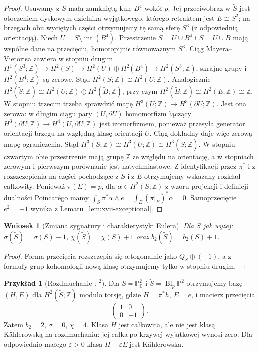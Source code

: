 \documentclass[11pt,a4paper,oneside]{report}
\newcommand{\C}{\mathbb{C}}
\newcommand{\Z}{\mathbb{Z}}
\theoremstyle{plain}
\newtheorem{wniosek}[twierdzenie]{Wniosek}
\theoremstyle{definition}
\newtheorem{przyklad}[twierdzenie]{Przykład}
\theoremstyle{remark}
\begin{document}
\begin{proof}
Usuwamy z $S$ małą zamkniętą kulę $B^4$ wokół $p$.
Jej przeciwobraz w $\widetilde S$ jest otoczeniem dyskowym
dzielnika wyjątkowego, którego retraktem jest $E\cong S^2$;
na brzegach obu wyciętych części otrzymujemy tę samą
sferę $S^3$ (z odpowiednią orientacją).
Niech $U=S\setminus\operatorname{int}(B^4)$.
Przestrzenie $S=U\cup B^4$ i
$\widetilde S=U\cup\widetilde B$
mają wspólne dane na przecięciu, homotopijnie równoważnym
$S^3$. Ciąg Mayera--Vietorisa zawiera w stopniu drugim
$H^1(S^3;\Z)\to H^2(S)\to H^2(U)\oplus H^2(B^4)
\to H^2(S^3;\Z)$; skrajne grupy i $H^2(B^4;\Z)$
są zerowe. Stąd $H^2(S;\Z)\cong H^2(U;\Z)$.
Analogicznie $H^2(\widetilde S;\Z)\cong
H^2(U;\Z)\oplus H^2(\widetilde B;\Z)$, przy czym
$H^2(\widetilde B;\Z)\cong H^2(E;\Z)\cong\Z$.
W stopniu trzecim trzeba sprawdzić mapę
$H^3(U;\Z)\to H^3(\partial U;\Z)$.
Jest ona zerowa: w długim ciągu pary $(U,\partial U)$
homomorfizm łączący
$H^3(\partial U;\Z)\to H^4(U,\partial U;\Z)$
jest izomorfizmem, ponieważ przesyła generator
orientacji brzegu na względną klasę orientacji $U$.
Ciąg dokładny daje więc zerową mapę ograniczenia.
Stąd $H^3(S;\Z)\cong H^3(U;\Z)\cong H^3(\widetilde S;\Z)$.
W stopniu czwartym obie przestrzenie mają grupę $\Z$
ze względu na orientację, a w stopniach zerowym i pierwszym
porównanie jest natychmiastowe.
Z identyfikacji przez $\pi^*$ i z rozszczepienia
na części pochodzące z $S$ i z $E$ otrzymujemy
wskazany rozkład całkowity.
Ponieważ $\pi(E)=p$, dla $\alpha\in H^2(S;\Z)$
z wzoru projekcji i definicji dualności Poincarégo mamy
$\int_{\widetilde S}\pi^*\alpha\wedge e
=\int_E(\pi|_E)^*\alpha=0$.
Samoprzecięcie $e^2=-1$ wynika z Lematu~\ref{lem:xvii-exceptional}.
\end{proof}
\begin{wniosek}[Zmiana sygnatury i charakterystyki Eulera]
Dla $S$ jak wyżej:
$\sigma(\widetilde S)=\sigma(S)-1$,
$\chi(\widetilde S)=\chi(S)+1$ oraz
$b_2(\widetilde S)=b_2(S)+1$.
\end{wniosek}
\begin{proof}
Forma przecięcia rozszczepia się ortogonalnie jako
$Q_S\oplus(-1)$, a z formuły grup kohomologii
nową klasę otrzymujemy tylko w stopniu drugim.
\end{proof}
\begin{przyklad}[Rozdmuchanie $\mathbb P^2$]
Dla $S=\mathbb P^2_\C$ i
$\widetilde S=\operatorname{Bl}_p\mathbb P^2$ otrzymujemy bazę
$(H,E)$ dla $H^2(\widetilde S;\Z)$ modulo torsję,
gdzie $H=\pi^*h$, $E=e$, i macierz przecięcia
\[
\begin{pmatrix}1&0\\0&-1\end{pmatrix}.
\]
Zatem $b_2=2$, $\sigma=0$, $\chi=4$.
Klasa $H$ jest całkowita, ale nie jest klasą Kählerowską
na rozdmuchaniu: jej całka po krzywej wyjątkowej wynosi zero.
Dla odpowiednio małego $\varepsilon>0$ klasa
$H-\varepsilon E$ jest Kählerowska.
\end{przyklad}
\end{document}
